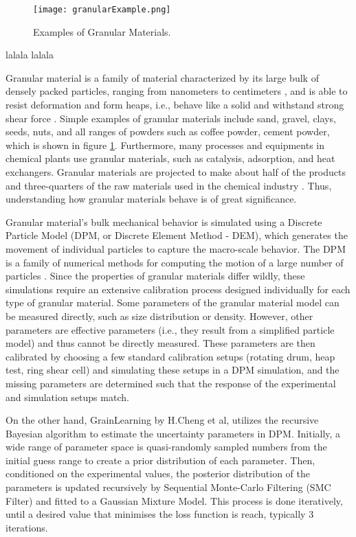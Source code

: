 \documentclass[../BachelorAssignment.tex]{subfiles}
\begin{document}
\graphicspath{{\subfix{../Images/}}}

\begin{figure}[H]
    \centering
    \texttt{[image: granularExample.png]}
    \caption{Examples of Granular Materials.\cite{granularExample}}
    \label{fig:granularExample}
\end{figure}


lalala lalala 



Granular material is a family of material characterized by its large bulk of densely packed particles, ranging from nanometers to centimeters \cite{introGranular2}, and is able to resist deformation and form heaps, i.e., behave like a solid and withstand strong shear force \cite{introGranular3}. Simple examples of granular materials include sand, gravel, clays, seeds, nuts, and all ranges of powders such as coffee powder, cement powder, which is shown in figure \ref{fig:granularExample}. Furthermore, many processes and equipments in chemical plants use granular materials, such as catalysis, adsorption, and heat exchangers. Granular materials are projected to make about half of the products and three-quarters of the raw materials used in the chemical industry \cite{introGranular}. Thus, understanding how granular materials behave is of great significance. 


Granular material's bulk mechanical behavior is simulated using a Discrete Particle Model (DPM, or Discrete Element Method - DEM), which generates the movement of individual particles to capture the macro-scale behavior. The DPM is a family of numerical methods for computing the motion of a large number of particles \cite{Weng:2015}. Since the properties of granular materials differ wildly, these simulations require an extensive calibration process designed individually for each type of granular material. Some parameters of the granular material model can be measured directly, such as size distribution or density. However, other parameters are effective parameters (i.e., they result from a simplified particle model) and thus cannot be directly measured. These parameters are then calibrated by choosing a few standard calibration setups (rotating drum, heap test, ring shear cell) and simulating these setups in a DPM simulation, and the missing parameters are determined such that the response of the experimental and simulation setups match. 

On the other hand, GrainLearning by H.Cheng et al, utilizes the recursive Bayesian algorithm to estimate the uncertainty parameters in DPM. Initially, a wide range of parameter space is quasi-randomly sampled numbers from the initial guess range to create a prior distribution of each parameter. Then, conditioned on the experimental values, the posterior distribution of the parameters is updated recursively by Sequential Monte-Carlo Filtering (SMC Filter) and fitted to a Gaussian Mixture Model. This process is done iteratively, until a desired value that minimises the loss function is reach, typically 3 iterations. 
\end{document}

